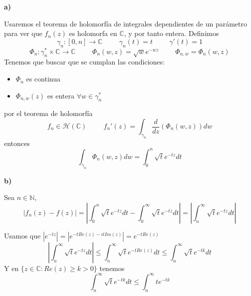 \begin{sol}

\textbf{a)}

Usaremos el teorema de holomorfía de integrales dependientes de un parámetro para ver que $f_n(z)$ es holomorfa en $\mathbb{C}$, y por tanto entera.
Definimos
$$\gamma_n :[0,n] \rightarrow \mathbb{C} \hspace{1cm} \gamma_n(t)=t \hspace{1cm} \gamma'(t) = 1$$
$$\Phi_n : \gamma_n^{\ast}\times\mathbb{C} \rightarrow \mathbb{C} \hspace{1cm} \Phi_n(w,z) = \sqrt{w}e^{-wz} \hspace{1cm} \Phi_{n,w} = \Phi_n(w,z)$$
Tenemos que buscar que se cumplan las condiciones:
\begin{itemize}
	\item $\Phi_n$ es continua
	\item $\Phi_{n,w}(z)$ es entera $\forall w\in\gamma_n^{\ast}$
\end{itemize}

por el teorema de holomorfía
$$f_n \in\mathcal{H}(\mathbb{C}) \hspace{1cm}f_n'(z) = \int_{\gamma_n} \frac{d}{dz} (\Phi_n(w,z)) dw$$
entonces
$$\int_{\gamma_n}\Phi_n(w,z) dw = \int_0^n \sqrt{t}e^{-tz} dt$$


\textbf{b)}

Sea $n\in\mathbb{N}$,
$$|f_n(z) - f(z)| = |\int_{0}^{n} \sqrt{t} e^{-tz}dt - \int_{0}^{\infty} \sqrt{t}e^{-tz}dt| = |\int_{n}^{\infty} \sqrt{t} e^{-tz}dt|$$

Usamos que 
$|e^{-tz}| = |e^{-tRe(z)-itIm(z)}| = e^{-tRe(z)}$
$$|\int_{n}^{\infty} \sqrt{t} e^{-tz}dt| \leq \int_{n}^{\infty} \sqrt{t}e^{-tRe(z)} dt \leq \int_{n}^{\infty} \sqrt{t}e^{-tk}dt $$
Y en $\{ z\in\mathbb{C} : Re(z)\geq k > 0 \}$ tenemos
$$ \int_{n}^{\infty} \sqrt{t}e^{-tk} dt \leq \int_{n}^{\infty} te^{-tk}$$
\end{sol}
